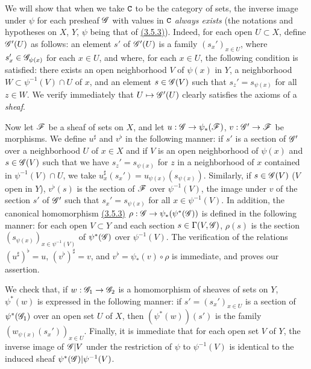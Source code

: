 \begin{env}[3.7.1]
\label{env-0.3.7.1}
We will show that when we take $\mathtt{C}$ to be the category of sets, the inverse
image under $\psi$ for each presheaf $\mathscr{G}$ with values in $\mathtt{C}$ {\em always
exists} (the notations and hypotheses on $X$, $Y$, $\psi$ being that of
\hyperref[env-0.3.5.3]{(3.5.3)}). Indeed, for each open $U\subset X$, define $\mathscr{G}'(U)$
as follows: an element $s'$ of $\mathscr{G}'(U)$ is a family $(s_x')_{x\in U}$, where
$s_x'\in\mathscr{G}_{\psi(x)}$ for each $x\in U$, and where, for each $x\in U$, the
following condition is satisfied: there exists an open neighborhood $V$ of
$\psi(x)$ in $Y$, a neighborhood $W\subset\psi^{-1}(V)\cap U$ of $x$, and an
element $s\in\mathscr{G}(V)$ such that $s_z'=s_{\psi(x)}$ for all $z\in W$. We verify
immediately that $U\mapsto\mathscr{G}'(U)$ clearly satisfies the axioms of a
{\em sheaf}.

Now let $\mathscr{F}$ be a sheaf of sets on $X$, and let $u:\mathscr{G}\to\psi_*(\mathscr{F})$,
$v:\mathscr{G}'\to\mathscr{F}$ be morphisms. We define $u^\sharp$ and $v^\flat$ in the
following manner: if $s'$ is a section of $\mathscr{G}'$ over a neighborhood $U$ of
$x\in X$ and if $V$ is an open neighborhood of $\psi(x)$ and $s\in\mathscr{G}(V)$
such that we have $s_z'=s_{\psi(x)}$ for $z$ in a neighborhood of $x$ contained
in $\psi^{-1}(V)\cap U$, we take $u_x^\sharp(s_x')=u_{\psi(x)}(s_{\psi(x)})$.
Similarly, if $s\in\mathscr{G}(V)$ ($V$ open in $Y$), $v^\flat(s)$ is the section of
$\mathscr{F}$ over $\psi^{-1}(V)$, the image under $v$ of the section $s'$ of
$\mathscr{G}'$ such that $s_x'=s_{\psi(x)}$ for all $x\in\psi^{-1}(V)$. In addition,
the canonical homomorphism \hyperref[env-0.3.5.3]{(3.5.3)}
$\rho:\mathscr{G}\to\psi_*(\psi^*(\mathscr{G}))$ is defined in the following manner: for
each open $V\subset Y$ and each section $s\in\Gamma(V,\mathscr{G})$, $\rho(s)$ is the
section $(s_{\psi(x)})_{x\in\psi^{-1}(V)}$ of $\psi^*(\mathscr{G})$ over
$\psi^{-1}(V)$. The verification of the relations $(u^\sharp)^\flat=u$,
$(v^\flat)^\sharp=v$, and $v^\flat=\psi_*(v)\circ\rho$ is immediate, and proves
our assertion.

We check that, if $w:\mathscr{G}_1\to\mathscr{G}_2$ is a homomorphism of sheaves of sets
on $Y$, $\psi^*(w)$ is expressed in the following manner: if
$s'=(s_x')_{x\in U}$ is a section of $\psi^*(\mathscr{G}_1)$ over an open set $U$ of
$X$, then $(\psi^*(w))(s')$ is the family $(w_{\psi(x)}(s_x'))_{x\in U}$.
Finally, it is immediate that for each open set $V$ of $Y$, the inverse image of
$\mathscr{G}|V$ under the restriction of $\psi$ to $\psi^{-1}(V)$ is identical to the
induced sheaf $\psi^*(\mathscr{G})|\psi^{-1}(V)$.


\end{env}
